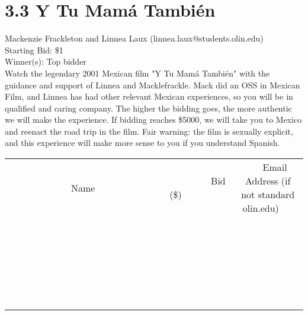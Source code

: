\documentclass[11pt]{article}
\begin{document}
\section*{3.3 Y Tu Mamá También}
Mackenzie Frackleton and Linnea Laux (linnea.laux@students.olin.edu) \\
Starting Bid: \$1 \\
Winner(s): 
Top bidder \\
Watch the legendary 2001 Mexican film "Y Tu Mamá También" with the guidance and support of Linnea and Macklefrackle. Mack did an OSS in Mexican Film, and Linnea has had other relevant Mexican experiences, so you will be in qualified and caring company.  The higher the bidding goes, the more authentic we will make the experience. If bidding reaches \$5000, we will take you to Mexico and reenact the road trip in the film.
Fair warning: the film is sexually explicit, and this experience will make more sense to you if you understand Spanish. \\[6ex]
\begin{tabular}{c c c}
~~~~~~~~~~~~~Name~~~~~~~~~~~~~ & ~~~~~~~~~Bid (\$)~~~~~~~~~ & ~~~Email Address (if not standard olin.edu)~~~ \\
 & & \\
\hline
 & & \\
\hline
 & & \\
\hline
 & & \\
\hline
 & & \\
\hline
 & & \\
\hline
 & & \\
\hline
 & & \\
\hline
 & & \\
\hline
 & & \\
\hline
 & & \\
\hline
 & & \\
\hline
 & & \\
\hline
 & & \\
\hline
 & & \\
\hline
 & & \\
\hline
 & & \\
\hline
 & & \\
\hline
 & & \\
\hline
 & & \\
\hline
 & & \\
\hline
 & & \\
\hline
 & & \\
\hline
 & & \\
\hline
 & & \\
\hline
 & & \\
\hline
\end{tabular}
\clearpage
\end{document}
